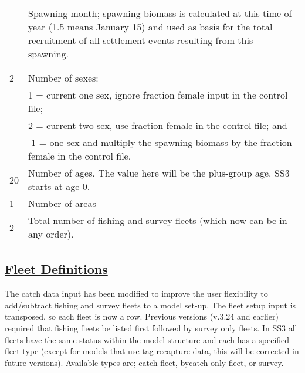 \begin{center}
\begin{longtable}{p{3cm} p{12cm}}
		\hline
		\raisebox{0.1\ht\strutbox}{\hypertarget{RecrTiminig}{1.5}} & \multirow{1}{1cm}[-0.1cm]{\parbox{12cm}{Spawning month; spawning biomass is calculated at this time of year (1.5 means January 15) and used as basis for the total recruitment of all settlement events resulting from this spawning.}} \Tstrut\\
		& \\
		& \Bstrut\\

		\hline
		2 \Tstrut & Number of sexes: \\
		 & 1 = current one sex, ignore fraction female input in the control file;\\
		 & 2 = current two sex, use fraction female in the control file; and \\
		 & -1 = one sex and multiply the spawning biomass by the fraction female in the control file. \Bstrut\\

		\hline
		20 \Tstrut & Number of ages. The value here will be the plus-group age. SS3 starts at age 0. \\

		\hline
		1 & Number of areas \Tstrut\Bstrut\\

		\hline
		2 \Tstrut & Total number of fishing and survey fleets (which now can be in any order).\\
		\hline
	\end{longtable}
	\leavevmode\tagmcend\tagstructend\par
	\vspace*{-1.7\baselineskip}
\end{center}

\hypertarget{FleetDefinitions}{}
\subsection[Fleet Definitions]{\protect\hyperlink{FleetDefinitions}{Fleet Definitions}}
\hypertarget{GenericFleets}{}
The catch data input has been modified to improve the user flexibility to add/subtract fishing and survey fleets to a model set-up. The fleet setup input is transposed, so each fleet is now a row. Previous versions (v.3.24 and earlier) required that fishing fleets be listed first followed by survey only fleets. In SS3 all fleets have the same status within the model structure and each has a specified fleet type (except for models that use tag recapture data, this will be corrected in future versions). Available types are; catch fleet, bycatch only fleet, or survey.   


